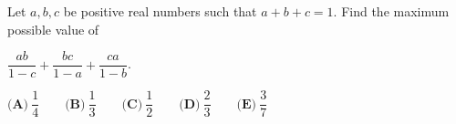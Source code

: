 Let $a,b,c$ be positive real numbers such that $a+b+c = 1$. Find the maximum possible value of

$\dfrac{ab}{1-c} + \dfrac{bc}{1-a} + \dfrac{ca}{1-b}$.

$\textbf{(A)}~\dfrac{1}{4}\qquad\textbf{(B)}~\dfrac{1}{3}\qquad\textbf{(C)}~\dfrac{1}{2}\qquad\textbf{(D)}~\dfrac{2}{3}\qquad\textbf{(E)}~\dfrac{3}{7}\qquad$
